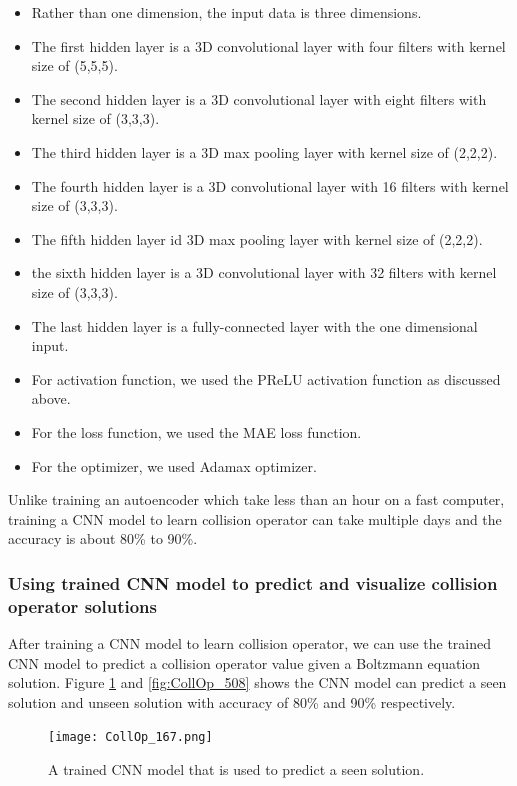 \documentclass{article}
\begin{document}
\begin{itemize}
	\item Rather than one dimension, the input data is three dimensions.
	\item The first hidden layer is a 3D convolutional layer with four filters with kernel size of (5,5,5).
	\item The second hidden layer is a 3D convolutional layer with eight filters with kernel size of (3,3,3).
	\item The third hidden layer is a 3D max pooling layer with kernel size of (2,2,2).
	\item The fourth hidden layer is a 3D convolutional layer with 16 filters with kernel size of (3,3,3).
	\item The fifth hidden layer id 3D max pooling layer with kernel size of (2,2,2).
	\item the sixth hidden layer is a 3D convolutional layer with 32 filters with kernel size of (3,3,3).
	\item The last hidden layer is a fully-connected layer with the one dimensional input.
	\item For activation function, we used the PReLU activation function as discussed above.
	\item For the loss function, we used the MAE loss function.
	\item For the optimizer, we used Adamax optimizer.
\end{itemize}
Unlike training an autoencoder which take less than an hour on a fast computer, training a CNN model to learn collision operator can take multiple days and the accuracy is about 80\% to 90\%.

\subsubsection{Using trained CNN model to predict and visualize collision operator solutions}
After training a CNN model to learn collision operator, we can use the trained CNN model to predict a collision operator value given a Boltzmann equation solution. Figure \ref{fig:CollOp_167} and \ref{fig:CollOp_508} shows the CNN model can predict a seen solution and unseen solution with accuracy of 80\% and 90\% respectively.

\begin{figure}[h]
	\centering
	\texttt{[image: CollOp\_167.png]}
	\caption{A trained CNN model that is used to predict a seen solution.}
	\label{fig:CollOp_167}
\end{figure}
\end{document}
